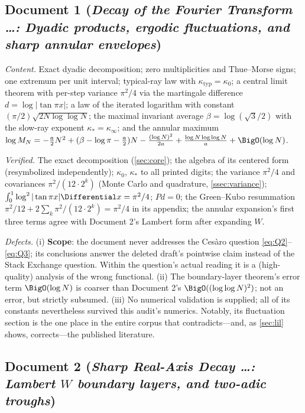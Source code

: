 \documentclass[11pt,oneside]{article}
\theoremstyle{definition}
\theoremstyle{remark}
\begin{document}
\subsection{Document 1 (\emph{Decay of the Fourier Transform \dots:
Dyadic products, ergodic fluctuations, and sharp annular envelopes})}

\emph{Content.}  Exact dyadic decomposition; zero multiplicities and
Thue--Morse signs; one extremum per unit interval; typical-ray law with
$\kappa_{\mathrm{typ}}=\kappa_0$; a central limit theorem with per-step
variance $\pi^2/4$ via the martingale difference
$d=\log|\tan\pi x|$; a law of the iterated logarithm with constant
$(\pi/2)\sqrt{2N\log\log N}$; the maximal invariant average
$\beta=\log(\sqrt3/2)$ with the slow-ray exponent
$\kappa_*=\kappa_\infty$; and the annular maximum
$\log M_N=-\tfrac a2N^2+(\beta-\log\pi-\tfrac a2)N
-\frac{(\log N)^2}{2a}+\frac{\log N\log\log N}{a}+\BigO(\log N)$.

\emph{Verified.}  The exact decomposition (\cref{sec:core}); the algebra of
its centered form (resymbolized independently); $\kappa_0$, $\kappa_*$ to
all printed digits; the variance $\pi^2/4$ and covariances
$\pi^2/(12\cdot2^k)$ (Monte Carlo and quadrature,
\cref{ssec:variance}); $\int_0^1\log^2|\tan\pi x|\Differential x=\pi^2/4$;
$Pd=0$; the Green--Kubo resummation $\pi^2/12+2\sum_k\pi^2/(12\cdot2^k)
=\pi^2/4$ in its appendix; the annular expansion's first three terms agree
with Document 2's Lambert form after expanding $W$.

\emph{Defects.}
(i) \textbf{Scope}: the document never addresses the Ces\`aro question
\eqref{eq:Q2}--\eqref{eq:Q3}; its conclusions answer the deleted draft's
pointwise claim instead of the Stack Exchange question.  Within the
question's actual reading it is a (high-quality) analysis of the wrong
functional.
(ii) The boundary-layer theorem's error term $\BigO(\log N)$ is coarser
than Document 2's $\BigO((\log\log N)^2)$; not an error, but strictly
subsumed.
(iii) No numerical validation is supplied; all of its constants
nevertheless survived this audit's numerics.  Notably, its fluctuation
section is the one place in the entire corpus that contradicts---and,
as \cref{sec:lil} shows, corrects---the published literature.

\subsection{Document 2 (\emph{Sharp Real-Axis Decay \dots: Lambert $W$
boundary layers, and two-adic troughs})}
\end{document}
